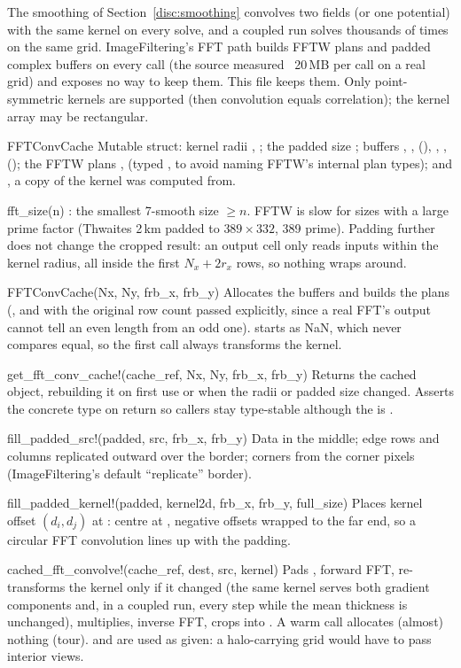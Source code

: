 The smoothing of Section~\ref{disc:smoothing} convolves two fields (or one potential) with the same kernel on every
solve, and a coupled run solves thousands of times on the same grid. ImageFiltering's FFT path builds FFTW plans and
padded complex buffers on every call (the source measured ~20\,MB per call on a real grid) and exposes no way to keep
them. This file keeps them. Only point-symmetric kernels are supported (then convolution equals correlation); the
kernel array may be rectangular.
\begin{fnlist}
\item[FFTConvCache] Mutable struct: kernel radii , ; the padded size ; buffers
  , ,  (), , , 
  (); the FFTW plans ,  (typed , to avoid naming FFTW's internal plan
  types); and , a copy of the kernel  was computed from.
\item[fft\_size(n)] : the smallest 7-smooth size $\ge n$. FFTW is slow for sizes with a large prime
  factor (Thwaites 2\,km padded to $389\times332$, 389 prime). Padding further does not change the cropped result: an
  output cell only reads inputs within the kernel radius, all inside the first $N_x + 2r_x$ rows, so nothing wraps around.
\item[FFTConvCache(Nx, Ny, frb\_x, frb\_y)] Allocates the buffers and builds the plans (, and 
  with the original row count passed explicitly, since a real FFT's output cannot tell an even length from an odd one).
   starts as NaN, which never compares equal, so the first call always transforms the kernel.
\item[get\_fft\_conv\_cache!(cache\_ref, Nx, Ny, frb\_x, frb\_y)] Returns the cached object, rebuilding it on first use or when
  the radii or padded size changed. Asserts the concrete type on return so callers stay type-stable although the
   is .
\item[fill\_padded\_src!(padded, src, frb\_x, frb\_y)] Data in the middle; edge rows and columns replicated outward over the
  border; corners from the corner pixels (ImageFiltering's default ``replicate'' border).
\item[fill\_padded\_kernel!(padded, kernel2d, frb\_x, frb\_y, full\_size)] Places kernel offset $(d_i, d_j)$ at
  : centre at \code{[1, 1]}, negative offsets wrapped to the far end, so a circular FFT
  convolution lines up with the padding.
\item[cached\_fft\_convolve!(cache\_ref, dest, src, kernel)] Pads , forward FFT, re-transforms the kernel only if it
  changed (the same kernel serves both gradient components and, in a coupled run, every step while the mean thickness is
  unchanged), multiplies, inverse FFT, crops into . A warm call allocates (almost) nothing (tour).  and
   are used as given: a halo-carrying grid would have to pass interior views.
\end{fnlist}

